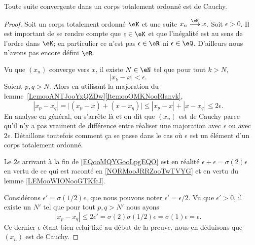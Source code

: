 \begin{proposition}     \label{PROPooTFVOooFoSHPg}
	Toute suite convergente dans un corps totalement ordonné est de Cauchy.
\end{proposition}

\begin{proof}
	Soit un corps totalement ordonné \( \eK\) et une suite \( x_n\stackrel{\eK}{\longrightarrow}x\). Soit \( \epsilon>0\). Il est important de se rendre compte que \( \epsilon\in \eK\) et que l'inégalité est au sens de l'ordre dans \( \eK\); en particulier ce n'est pas \( \epsilon\in \eR\) ni \( \epsilon\in \eQ\). D'ailleurs nous n'avons pas encore défini \( \eR\).

	Vu que \( (x_n)\) converge vers \( x\), il existe \( N\in \eN\) tel que pour tout \( k>N\),
	\begin{equation}
		| x_k-x |<\epsilon.
	\end{equation}
	Soient \( p,q>N\). Alors en utilisant la majoration du lemme~\ref{LemooANTJooYxQZDw}\ref{ItemooOMKNooRlanvk},
	\begin{equation}        \label{EQooMQYGooLpgEQO}
		| x_p-x_q |=\big| (x_p-x)+(x-x_q) \big|\leq | x_p-x |+| x-x_q |\leq 2\epsilon.
	\end{equation}
	En analyse en général, on s'arrête là et on dit que \( (x_n)\) est de Cauchy parce qu'il n'y a pas vraiment de différence entre réaliser une majoration avec \( \epsilon\) ou avec \( 2\epsilon\). Détaillons toutefois comment ça se passe dans le cas où \( \epsilon\) est un élément d'un corps totalement ordonné.

	Le \( 2\epsilon\) arrivant à la fin de \eqref{EQooMQYGooLpgEQO} est en réalité \( \epsilon+\epsilon=\sigma(2)\epsilon\) en vertu de ce qui est raconté en \ref{NORMooJRRZooTwTVYG} et en vertu du lemme \ref{LEMooWIONooGTKfcJ}.

	Considérons \( \epsilon'=\sigma(1/2)\epsilon\), que nous pouvons noter \( \epsilon'=\epsilon/2\). Vu que \( \epsilon'>0\), il existe un \( N'\) tel que pour tout \( p,q>N'\) nous ayons
	\begin{equation}
		| x_p-x_q |\leq 2\epsilon'=\sigma(2)\sigma(1/2)\epsilon=\sigma(1)\epsilon=\epsilon.
	\end{equation}
	Ce dernier \( \epsilon\) étant bien celui fixé au début de la preuve, nous en déduisons que \( (x_n)\) est de Cauchy.
\end{proof}

